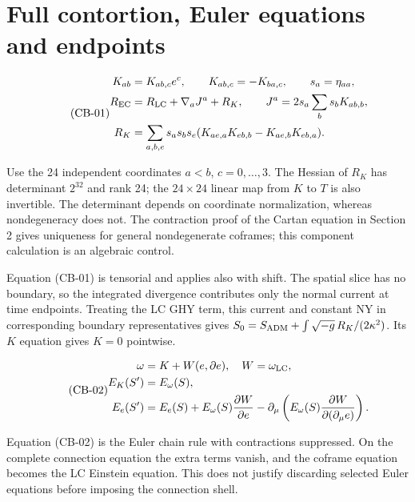 \section{Full contortion, Euler equations and endpoints}

\begin{equation}\tag{CB-01}\label{eq:CB-01}
\begin{aligned}K_{ab}&=K_{ab,c}e^c,\qquad K_{ab,c}=-K_{ba,c},\qquad s_a=\eta_{aa},\\ R_{\rm EC}&=R_{\rm LC}+\nabla_aJ^a+R_K,\qquad J^a=2s_a\sum_bs_bK_{ab,b},\\ R_K&=\sum_{a,b,e}s_as_bs_e(K_{ae,a}K_{eb,b}-K_{ae,b}K_{eb,a}).\end{aligned}
\end{equation}

Use the 24 independent coordinates $a<b$, $c=0,\ldots,3$. The Hessian of $R_K$ has determinant $2^{32}$ and rank 24; the $24\times24$ linear map from $K$ to $T$ is also invertible. The determinant depends on coordinate normalization, whereas nondegeneracy does not. The contraction proof of the Cartan equation in Section 2 gives uniqueness for general nondegenerate coframes; this component calculation is an algebraic control.

Equation (CB-01) is tensorial and applies also with shift. The spatial slice has no boundary, so the integrated divergence contributes only the normal current at time endpoints. Treating the LC GHY term, this current and constant NY in corresponding boundary representatives gives $S_0=S_{\rm ADM}+\int\sqrt{-g}\,R_K/(2\kappa^2)$. Its $K$ equation gives $K=0$ pointwise.

\begin{equation}\tag{CB-02}\label{eq:CB-02}
\begin{aligned}\omega&=K+W(e,\partial e),\quad W=\omega_{\rm LC},\\ E_K(S')&=E_\omega(S),\\ E_e(S')&=E_e(S)+E_\omega(S)\frac{\partial W}{\partial e}-\partial_\mu\left(E_\omega(S)\frac{\partial W}{\partial(\partial_\mu e)}\right).\end{aligned}
\end{equation}

Equation (CB-02) is the Euler chain rule with contractions suppressed. On the complete connection equation the extra terms vanish, and the coframe equation becomes the LC Einstein equation. This does not justify discarding selected Euler equations before imposing the connection shell.

